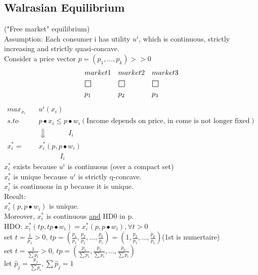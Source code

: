 \documentclass[letterpaper,13pt,single,pdftex]{scrartcl}
\def\msquare{\mathord{\scalerel*{\Box}{gX}}}
\begin{document}
\subsection{Walrasian Equilibrium}
("Free market" equilibrium)\\

Assumption: Each consumer i has utility $u^i$, which is continuous, strictly increasing and strictly quasi-concave.\\
Consider a price vector $p = (p_1,\dots, p_k) >> 0$
\begin{align*}
    &market1 & &market2 & &market3\\
    &\msquare & &\msquare  & &\msquare\\
    &p_1\qquad & &p_2\qquad  & &p_3
\end{align*}
\begin{align*}
    max_{x_i}\quad &u^i(x_i) \\
    s.to\quad  &p\bullet x_i \le p\bullet w_i (\text{Income depends on price, in come is not longer fixed})\\
    &\Downarrow \qquad\quad  I_i\\
    x_i^* =& x_i^*(p,p\bullet w_i)\\
    &\qquad \quad I_i
\end{align*}
$x_i^*$ exists because $u^i$ is continuous (over a compact set)\\
$x_i^*$ is unique because $u^i$ is strictly q-concave.\\
$x_i^*$ is continuous in p because it is unique. \\

Result:\\
$x_i^*(p, p\bullet w_i)$ is unique. \\
Moreover, $x_i^*$ is continuous \underline{and} HD0 in p.\\
HDO: $x_i^*(tp,tp\bullet w_i) = x_i^*(p,p\bullet w_i),\forall t>0$\\
set $t = \frac{1}{p_1} > 0, \, tp=(\frac{p_1}{p_1},\frac{p_2}{p_1},\dots,\frac{p_k}{p_1}) = (1,\frac{p_2}{p_1},\dots,\frac{p_k}{p_1}) $(1st is numertaire)\\
set $t = \frac{1}{\sum p_i} > 0, \, tp=(\frac{p_1}{\sum p_i},\frac{p_2}{\sum p_i},\dots,\frac{p_k}{\sum p_i}) $\\
let $\hat{p}_j = \frac{p_j}{\sum p_i}, \sum \hat{p}_j = 1$\\
\end{document}
